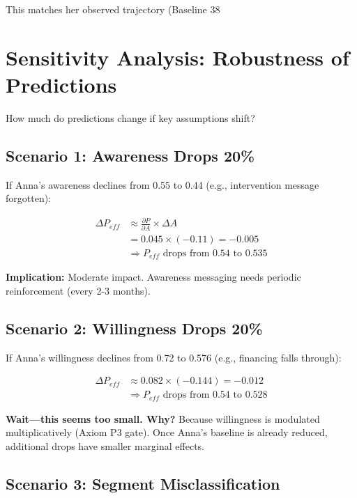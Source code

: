 This matches her observed trajectory (Baseline 38%

\section{Sensitivity Analysis: Robustness of Predictions}\label{sec:ch16-sensitivity}

How much do predictions change if key assumptions shift?

\subsection{Scenario 1: Awareness Drops 20\%}

If Anna's awareness declines from 0.55 to 0.44 (e.g., intervention message forgotten):

\begin{align}
\Delta P_{eff} &\approx \frac{\partial P}{\partial A} \times \Delta A \\
&= 0.045 \times (-0.11) = -0.005 \\
&\Rightarrow P_{eff} \text{ drops from } 0.54 \text{ to } 0.535
\end{align}

\textbf{Implication:} Moderate impact. Awareness messaging needs periodic reinforcement (every 2-3 months).

\subsection{Scenario 2: Willingness Drops 20\%}

If Anna's willingness declines from 0.72 to 0.576 (e.g., financing falls through):

\begin{align}
\Delta P_{eff} &\approx 0.082 \times (-0.144) = -0.012 \\
&\Rightarrow P_{eff} \text{ drops from } 0.54 \text{ to } 0.528
\end{align}

\textbf{Wait—this seems too small. Why?} Because willingness is modulated multiplicatively (Axiom P3 gate). Once Anna's baseline is already reduced, additional drops have smaller marginal effects.

\subsection{Scenario 3: Segment Misclassification}

